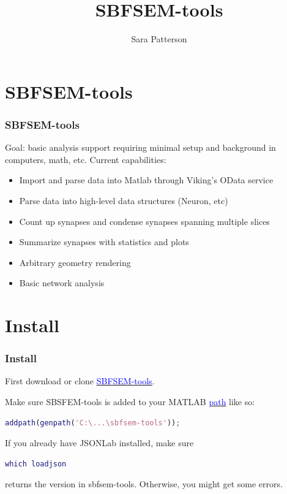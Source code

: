 \documentclass[11pt]{beamer}
\title{SBFSEM-tools}
\author{Sara Patterson}
\institute{Neitz Lab, University of Washington}
\begin{document}
	\maketitle
\section{SBFSEM-tools}
\begin{frame}
	\frametitle{SBFSEM-tools}
	Goal: basic analysis support requiring minimal setup and background in computers, math, etc.
	\vskip10pt
	Current capabilities:
	\begin{itemize}
		\item Import and parse data into Matlab through Viking's OData service
		\item Parse data into high-level data structures (Neuron, etc)
		\item Count up synapses and condense synapses spanning multiple slices 
		\item Summarize synapses with statistics and plots
		\item Arbitrary geometry rendering
		\item Basic network analysis
	\end{itemize}
\end{frame}
\section{Install}
\begin{frame}[fragile]
	\frametitle{Install}
	First download or clone \href{www.github.com/sarastokes/sbfsem-tools}{\textcolor{blue}{SBFSEM-tools}}.
	
	Make sure SBSFEM-tools is added to your MATLAB \href{https://www.mathworks.com/help/matlab/ref/addpath.html}{\textcolor{blue}{path}} like so:
	\begin{lstlisting}[language=matlab]	
	addpath(genpath('C:\...\sbfsem-tools'));\end{lstlisting}
	If you already have JSONLab installed, make sure 
	\begin{lstlisting}[language=matlab] 
	which loadjson\end{lstlisting} 
	returns the version in sbfsem-tools. Otherwise, you might get some errors.
\end{frame}
\end{document}

